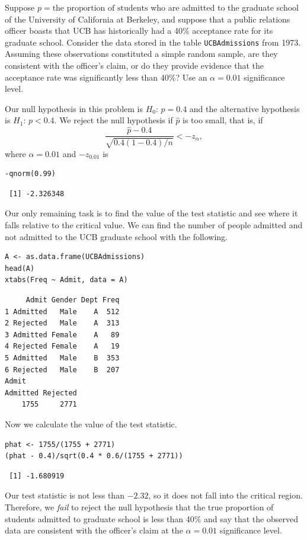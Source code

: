 \documentclass[captions=tableheading]{scrbook}
\begin{document}
\begin{example}
\label{exa:prop-test-pvalue-A}

Suppose \(p=\mbox{the proportion of students}\) who are admitted to the graduate school of the University of California at Berkeley, and suppose that a public relations officer boasts that UCB has historically had a 40\% acceptance rate for its graduate school. Consider the data stored in the table \texttt{UCBAdmissions} from 1973. Assuming these observations constituted a simple random sample, are they consistent with the officer's claim, or do they provide evidence that the acceptance rate was significantly less than 40\%? Use an \(\alpha=0.01\) significance level.

Our null hypothesis in this problem is \(H_{0}:\, p=0.4\) and the alternative hypothesis is \(H_{1}:\, p<0.4\). We reject the null hypothesis if \(\hat{p}\) is too small, that is, if
\begin{equation} 
\frac{\hat{p}-0.4}{\sqrt{0.4(1-0.4)/n}}<-z_{\alpha},
\end{equation}
where \(\alpha=0.01\) and \(-z_{0.01}\) is 

\begin{verbatim}
-qnorm(0.99)
\end{verbatim}

\begin{verbatim}
 [1] -2.326348
\end{verbatim}

Our only remaining task is to find the value of the test statistic and see where it falls relative to the critical value. We can find the number of people admitted and not admitted to the UCB graduate school with the following. 


\begin{verbatim}
A <- as.data.frame(UCBAdmissions)
head(A)
xtabs(Freq ~ Admit, data = A)
\end{verbatim}


\begin{verbatim}
     Admit Gender Dept Freq
1 Admitted   Male    A  512
2 Rejected   Male    A  313
3 Admitted Female    A   89
4 Rejected Female    A   19
5 Admitted   Male    B  353
6 Rejected   Male    B  207
Admit
Admitted Rejected 
    1755     2771
\end{verbatim}

Now we calculate the value of the test statistic.


\begin{verbatim}
phat <- 1755/(1755 + 2771)
(phat - 0.4)/sqrt(0.4 * 0.6/(1755 + 2771))
\end{verbatim}

\begin{verbatim}
 [1] -1.680919
\end{verbatim}

Our test statistic is not less than \(-2.32\), so it does not fall into the critical region. Therefore, we \emph{fail} to reject the null hypothesis that the true proportion of students admitted to graduate school is less than 40\% and say that the observed data are consistent with the officer's claim at the \(\alpha=0.01\) significance level. 

\end{example}
\end{document}

